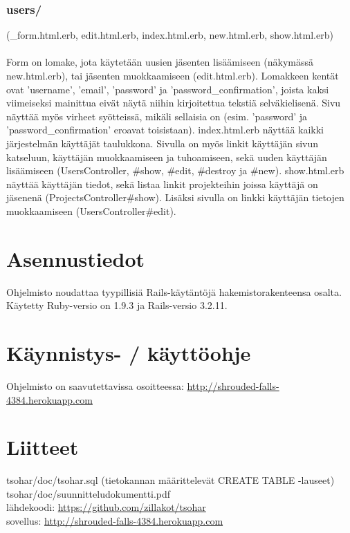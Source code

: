\documentclass[12pt,a4paper]{article}
\begin{document}
\subsubsection*{users/}
(\_form.html.erb, edit.html.erb, index.html.erb, new.html.erb, show.html.erb)\\\\
Form on lomake, jota käytetään uusien jäsenten lisäämiseen (näkymässä new.html.erb),
tai jäsenten muokkaamiseen (edit.html.erb). Lomakkeen kentät ovat 'username', 'email',
'password' ja 'password\_confirmation', joista kaksi viimeiseksi mainittua eivät näytä niihin
kirjoitettua tekstiä selväkielisenä. Sivu näyttää myös virheet syötteissä, mikäli sellaisia on
(esim. 'password' ja 'password\_confirmation' eroavat toisistaan).
index.html.erb näyttää kaikki järjestelmän käyttäjät taulukkona. Sivulla on myös linkit
käyttäjän sivun katseluun, käyttäjän muokkaamiseen ja tuhoamiseen, sekä uuden
käyttäjän lisäämiseen (UsersController, \#show, \#edit, \#destroy ja \#new).
show.html.erb näyttää käyttäjän tiedot, sekä listaa linkit projekteihin joissa käyttäjä on
jäsenenä (ProjectsController\#show). Lisäksi sivulla on linkki käyttäjän tietojen
muokkaamiseen (UsersController\#edit).

\section*{Asennustiedot}
Ohjelmisto noudattaa tyypillisiä Rails-käytäntöjä hakemistorakenteensa osalta.
Käytetty Ruby-versio on 1.9.3 ja Rails-versio 3.2.11.
\section*{Käynnistys- / käyttöohje}
Ohjelmisto on saavutettavissa osoitteessa: \url{http://shrouded-falls-4384.herokuapp.com}

\section*{Liitteet}
tsohar/doc/tsohar.sql (tietokannan määrittelevät CREATE TABLE -lauseet)\\
tsohar/doc/suunnitteludokumentti.pdf\\
lähdekoodi: \url{https://github.com/zillakot/tsohar}\\
sovellus: \url{http://shrouded-falls-4384.herokuapp.com}
\end{document}
